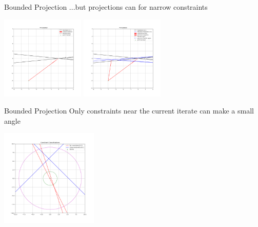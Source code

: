 \documentclass{beamer}
\begin{document}
\begin{frame}{Bounded Projection}
	...but projections can for narrow constraints
	\begin{center}
		\includegraphics[width=150px]{images/hoffman_2.png}
		\includegraphics[width=150px]{images/hoffman_3.png}
	\end{center}
\end{frame}



\begin{frame}{Bounded Projection}
	Only constraints near the current iterate can make a small angle
	\begin{center}
		\includegraphics[width=175px]{images/classification.png}
	\end{center}
\end{frame}
\end{document}
